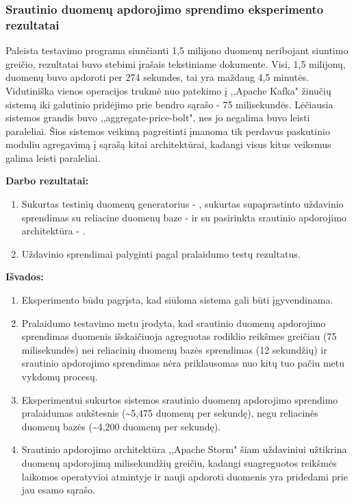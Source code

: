 \documentclass{VUMIFPSkursinis}
\begin{document}
\subsubsection{Srautinio duomenų apdorojimo sprendimo eksperimento rezultatai}
Paleista testavimo programa siunčianti 1,5 milijono duomenų neribojant siuntimo greičio, rezultatai buvo stebimi įrašais tekstiniame dokumente.
Visi, 1,5 milijonų, duomenų buvo apdoroti per 274 sekundes, tai yra maždaug 4,5 minutės. Vidutiniška vienos operacijos trukmė nuo 
patekimo į ,,Apache Kafka" žinučių sistemą iki galutinio pridėjimo prie bendro sąrašo - 75 milisekundės.
Lėčiausia sistemos grandis buvo ,,aggregate-price-bolt", nes jo negalima buvo leisti paraleliai. Šios sistemos veikimą pagreitinti 
įmanoma tik perdavus paskutinio moduliu agregavimą į sąrašą kitai architektūrai, kadangi visus kitus veiksmus galima leisti paraleliai.


\textbf{Darbo rezultatai:}
\vspace{1 mm}

    \begin{enumerate}
        \item Sukurtas testinių duomenų generatorius - , 
        sukurtas supaprastinto uždavinio sprendimas su reliacine duomenų baze - 
         ir su pasirinkta srautinio apdorojimo architektūra - .
        \item Uždavinio sprendimai palyginti pagal pralaidumo testų rezultatus.
    \end{enumerate}
    \vspace{1 mm}

\textbf{Išvados:}
\vspace{1 mm}

    \begin{enumerate}
    \item Eksperimento būdu pagrįsta, kad siūloma sistema gali būti įgyvendinama.
    \item Pralaidumo testavimo metu įrodyta, kad srautinio duomenų apdorojimo sprendimas duomenis išskaičiuoja 
    agreguotas rodiklio reikšmes greičiau (75 milisekundės) nei reliacinių duomenų bazės sprendimas (12 sekundžių) 
    ir srautinio apdorojimo sprendimas nėra priklausomas nuo kitų tuo pačiu metu vykdomų procesų.
    \item Eksperimentui sukurtos sistemos srautinio duomenų apdorojimo sprendimo pralaidumas aukštesnis 
    (\textasciitilde5,475 duomenų per sekundę), negu reliacinės duomenų bazės (\textasciitilde 4,200 duomenų per sekundę). 
    \item Srautinio apdorojimo architektūra ,,Apache Storm" šiam uždaviniui užtikrina duomenų apdorojimą milisekundžių greičiu,
    kadangi suagreguotos reikšmės laikomos operatyvioi atmintyje ir nauji apdoroti duomenis yra pridedami prie jau esamo sąrašo.

    \end{enumerate}

\printbibliography[heading=bibintoc] 
\end{document}

